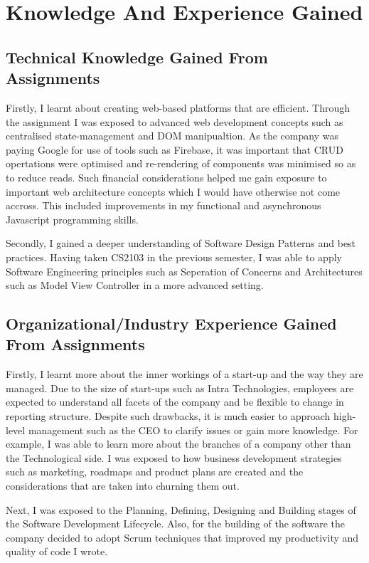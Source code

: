 \section{Knowledge And Experience Gained}
\subsection{Technical Knowledge Gained From Assignments}
\noindent
Firstly, I learnt about creating web-based platforms that are efficient. Through the assignment I was exposed to advanced web development concepts such as centralised state-management and DOM manipualtion. As the company was paying Google for use of tools such as Firebase, it was important that
CRUD opertations were optimised and re-rendering of components was minimised so as to reduce reads. Such financial considerations helped me gain exposure to important web architecture concepts which I would have otherwise
not come accross. This included improvements in my functional and asynchronous Javascript programming skills.

\noindent
Secondly, I gained a deeper understanding of Software Design Patterns and best practices. Having taken CS2103 in the previous semester, I was able to apply Software Engineering principles such as Seperation of Concerns and
Architectures such as Model View Controller in a more advanced setting.

\subsection{Organizational/Industry Experience Gained From Assignments}
\noindent 
Firstly, I learnt more about the inner workings of a start-up and the way they are managed. Due to the size of start-ups such as Intra Technologies, employees are expected to understand all facets of the
company and be flexible to change in reporting structure. Despite such drawbacks, it is much easier
to approach high-level management such as the CEO to clarify issues or gain more knowledge. For example, I was able to learn more about the branches of a company other than the Technological side. I was exposed to how
business development strategies such as marketing, roadmaps and product plans are created and the considerations that are taken into churning them out.

\noindent
Next, I was exposed to the Planning, Defining, Designing and Building stages of the Software Development Lifecycle. Also, for the building of the software the company decided to adopt Scrum techniques that
improved my productivity and quality of code I wrote.


